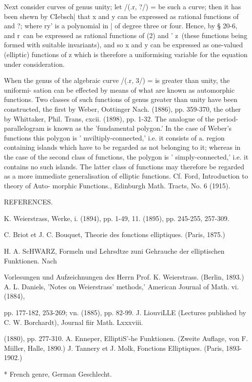 {Next consider curves of genus unity; let /(.r, ?/) = be such a curve;
then it has been shewn by CIebsch| that x and y can be expressed as
rational functions of and ?; where ry' is a polynomial in | of degree
three or four. Hence, by § 20-6, and r\ can be expressed as rational
functions of (2) and ' z\ (these functions being formed with suitable
invariants), and so x and y can be expressed as one-valued (elliptic)
functions of z which is therefore a uniformising variable for the
equation under consideration.

When the genus of the algebraic curve /(.r, 3/) = is greater than
unity, the uniformi- sation can be effected by means of what are known
as automorphic functions. Two classes of such functions of genus
greater than unity have been constructed, the first by Weber,
Oottinger Nach. (1886), pp. 359-370, the other by Whittaker, Phil.
Trans, cxcii. (1898), pp. 1-32. The analogue of the
period-parallelogram is known as the 'fundamental polygon.' In the
case of Weber's functions this polygon is ' mviltiply-connected,' i.e.
it consists of a. region containing islands which have to be regarded
as not belonging to it; whereas in the case of the second class of
functions, the polygon is ' simply-connected,' i.e. it contains no
such islands. The latter class of functions may therefore be regarded
as a more immediate generalisation of elliptic functions. Cf. Ford,
Introduction to theory of Auto- morphic Functions., Edinburgh Math.
Tracts, No. 6 (1915).

REFERENCES.

K. Weierstrass, Werke, i. (1894), pp. 1-49, 11. (1895), pp. 245-255,
257-309.

C. Briot et J. C. Bouquet, Theorie des fonctions elliptiques. (Paris,
1875.)

H. A. ScHWARZ, Formeln und Lehrsdtze zuni Gehrauche der elliptischen
Funktionen. Nach

Vorlesungen und Aufzeichnungen des Herrn Prof. K. Weierstrass.
(Berlin, 1893.) A. L. Daniels, 'Notes on Weierstrass' methods,'
American Journal of Math. vi. (1884),

pp. 177-182, 253-269; vn. (1885), pp. 82-99. J. LiouviLLE (Lectures
published by C. W. Borchardt), Journal fiir Math. Lxxxviii.

(1880), pp. 277-310. A. Enneper, ElliptiS'-he Funktionen. (Zweite
Auflage, von F. Miiller, Halle, 1890.) J. Tannery et J. Molk,
Fonctions Elliptiques. (Paris, 1893-1902.)

* French genre, German Geschlecht.

}
